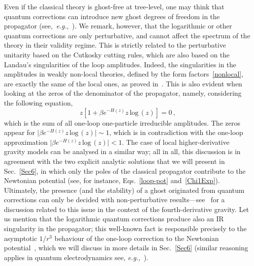 \documentclass[aps,prd,a4paper,twocolumn,showpacs,showkeys,preprintnumbers,amsmath,amssymb,nofootinbib]{revtex4-2}
\numberwithin{equation}{section}
\def\ln{\,\mbox{log}\,}
\begin{document}
Even if the classical theory is ghost-free at tree-level, one may think that quantum corrections can introduce new ghost degrees of freedom in the propagator (see,~\textit{e.g.},~\cite{CountGhost}). We remark, however, that the logarithmic or other quantum corrections are only perturbative, and cannot affect the spectrum of the theory in their validity regime. This is strictly related to the perturbative unitarity based on the Cutkosky cutting rules, which are also based on the Landau's singularities of the loop amplitudes. Indeed, the singularities in the amplitudes in weakly non-local theories, defined by the form factors~\eqref{nonlocal}, are exactly the same of the local ones, as proved in~\cite{BrisceseModesto,Efimov,PiuSen,Chin:2018puw}. This is also evident when looking at the zeros of the denominator of the propagator, namely, considering the following equation,
$$
z [  1 +  \beta  e^{-H(z)}z \ln (z) ] = 0 \, ,
$$
which is the sum of all one-loop one-particle irreducible amplitudes. 
The zeros appear for $\vert \beta  e^{-H(z)} z \ln (z)\vert  \sim 1$, which is in contradiction with the one-loop approximation 
$\vert \beta  e^{-H(z)} z \ln(z) \vert < 1$. The case of local higher-derivative gravity models can be analysed in a similar way; all in all, this discussion is in agreement with the two explicit analytic solutions that we will present in Sec.~\ref{Sec6}, in which only the poles of  the classical propagator contribute to the Newtonian potential (see, for instance, Eqs.~\eqref{loop-pot} and~\eqref{Chi1Exp}). Ultimately, the presence (and the stability) of a ghost originated from quantum corrections can only be decided with non-perturbative results---see~\cite{Salam:1978fd,Tomboulis:1977jk,Tomboulis:1983sw,Antoniadis:1986tu,Johnston:1987ue} for a discussion related to this issue in the context of the fourth-derivative gravity. Let us mention that the logarithmic quantum corrections produce also an IR singularity in the propagator; this well-known fact is responsible precisely to the asymptotic $1/r^3$ behaviour of the one-loop correction to the Newtonian potential~\cite{Duff:1974ud,Donoghue:1993&94,Muzinich:1995uj,Hamber:1995cq,Dalvit:1997yc,Akhundov:1996jd,Khriplovich:2002bt,BjerrumBohr:2002kt}, which we will discuss in more details in Sec.~\ref{Sec6} (similar reasoning applies in quantum electrodynamics see, {\it e.g.},~\cite{HelayelNeto:1999ut}).
\end{document}
